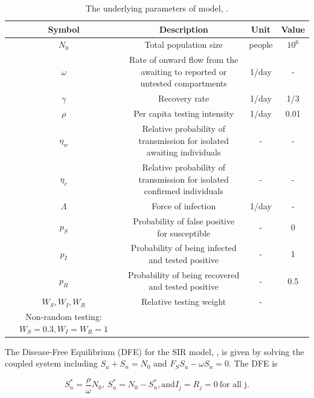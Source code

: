 \documentclass[12pt]{article}
\theoremstyle{definition} %
\begin{document}
\begin{landscape}
\begin{table}[htp]
\centering
{\tiny %
\begin{tabular}{|c|ccc|} \hline
  Symbol & Description & Unit & Value \\ \hline
  $N_0$     & Total population size & people & $10^6$ \\ \hline
  $\omega$  & Rate of onward flow from the awaiting to reported or untested compartments  & 1/day & - \\ \hline
  $\gamma$ & Recovery rate & 1/day & 1/3 \\ \hline 
  $\rho$   & Per capita testing intensity & 1/day & 0.01 \\ \hline 
  $\eta_w$  & Relative probability of transmission for isolated awaiting individuals & - & - \\ \hline
  $\eta_c$  & Relative probability of transmission for isolated confirmed individuals & - & -  \\ \hline
  $\Lambda$ & Force of infection & 1/day & - \\ \hline
  $p_S$ & Probability of false positive for susceptible& - & 0 \\ \hline
  $p_I$ & Probability of being infected and tested positive & - & 1 \\ \hline
  $p_R$ & Probability of being recovered and tested positive & - & 0.5 \\ \hline
  $W_S, W_I, W_R$ & Relative testing weight & - & 
  \begin{minipage}[t]{0.21\columnwidth}%
 Random testing: $W_S=W_I=W_R=1$, \\Non-random testing: $W_S=0.3, W_I=W_R=1$
\end{minipage} \\ \hline

  \end{tabular}
  }%
\caption{\label{tab:params} The underlying parameters of model, .}
\end{table}
\end{landscape}
\restoregeometry


The Disease-Free Equilibrium (DFE) for the SIR model, , is given by solving the coupled system including $S_u+S_n=N_0$ and $F_S S_u-\omega S_n=0$. The DFE is

\begin{equation}
\label{dfe}
S_n^*= \frac{\rho}{\omega} N_0, \ S_u^*= N_0-S_n^*, \text{and} I_j=R_j=0 \ \text{for all j}.
\end{equation}
\end{document}
